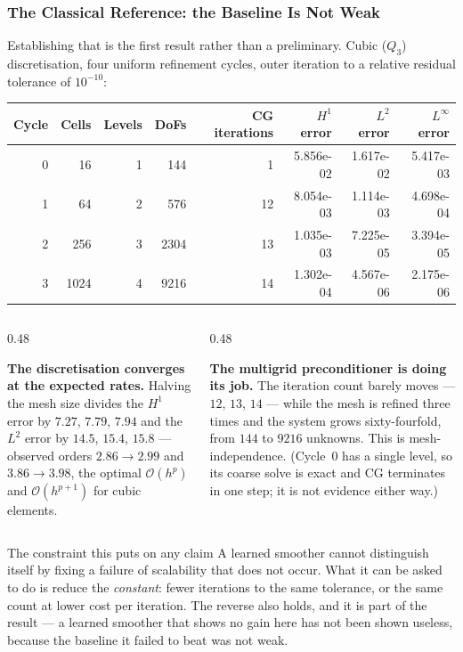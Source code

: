 \frametitle{The Classical Reference: the Baseline Is Not Weak}
\footnotesize

Establishing that is the first result rather than a preliminary. Cubic ($Q_3$)
discretisation, four uniform refinement cycles, outer iteration to a relative residual
tolerance of $10^{-10}$:

\vspace{1mm}
\centering
\begin{tabular}{@{}rrrrrrrr@{}}
\toprule
Cycle & Cells & Levels & DoFs & CG iterations & $H^1$ error & $L^2$ error & $L^\infty$ error \\
\midrule
0 & 16 & 1 & 144 & 1 & 5.856e-02 & 1.617e-02 & 5.417e-03 \\
1 & 64 & 2 & 576 & 12 & 8.054e-03 & 1.114e-03 & 4.698e-04 \\
2 & 256 & 3 & 2304 & 13 & 1.035e-03 & 7.225e-05 & 3.394e-05 \\
3 & 1024 & 4 & 9216 & 14 & 1.302e-04 & 4.567e-06 & 2.175e-06 \\
\bottomrule
\end{tabular}

\vspace{2mm}
\begin{columns}[T]
\begin{column}{0.48\textwidth}
\raggedright
\textbf{The discretisation converges at the expected rates.} Halving the mesh size divides
the $H^1$ error by $7.27$, $7.79$, $7.94$ and the $L^2$ error by $14.5$, $15.4$, $15.8$
--- observed orders $2.86\to2.99$ and $3.86\to3.98$, the optimal $\mathcal{O}(h^p)$ and
$\mathcal{O}(h^{p+1})$ for cubic elements.
\end{column}
\begin{column}{0.48\textwidth}
\raggedright
\textbf{The multigrid preconditioner is doing its job.} The iteration count barely moves
--- $12$, $13$, $14$ --- while the mesh is refined three times and the system grows
sixty-fourfold, from $144$ to $9216$ unknowns. This is mesh-independence.
(\alert{Cycle~0 has a single level}, so its coarse solve is exact and CG terminates in one
step; it is not evidence either way.)
\end{column}
\end{columns}

\vspace{1mm}
\begin{block}{The constraint this puts on any claim}
A learned smoother cannot distinguish itself by fixing a failure of scalability that does
not occur. What it can be asked to do is reduce the \emph{constant}: fewer iterations to
the same tolerance, or the same count at lower cost per iteration. The reverse also holds,
and it is part of the result --- a learned smoother that shows no gain here has not been
shown useless, because the baseline it failed to beat was not weak.
\end{block}
